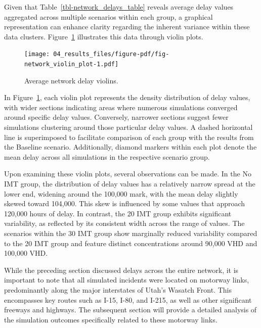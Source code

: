 \documentclass[fancy, oneside, mastersfancy, ms]{byuthesis}
\begin{document}
Given that Table~\ref{tbl-network_delays_table} reveals average delay
values aggregated across multiple scenarios within each group, a
graphical representation can enhance clarity regarding the inherent
variance within these data clusters.
Figure~\ref{fig-network_violin_plot} illustrates this data through
violin plots.

\begin{figure}

{\centering \texttt{[image: 04\_results\_files/figure-pdf/fig-network\_violin\_plot-1.pdf]}

}

\caption{\label{fig-network_violin_plot}Average network delay violins.}

\end{figure}

In Figure~\ref{fig-network_violin_plot}, each violin plot represents the
density distribution of delay values, with wider sections indicating
areas where numerous simulations converged around specific delay values.
Conversely, narrower sections suggest fewer simulations clustering
around those particular delay values. A dashed horizontal line is
superimposed to facilitate comparison of each group with the results
from the Baseline scenario. Additionally, diamond markers within each
plot denote the mean delay across all simulations in the respective
scenario group.

Upon examining these violin plots, several observations can be made. In
the No IMT group, the distribution of delay values has a relatively
narrow spread at the lower end, widening around the 100,000 mark, with
the mean delay slightly skewed toward 104,000. This skew is influenced
by some values that approach 120,000 hours of delay. In contrast, the 20
IMT group exhibits significant variability, as reflected by its
consistent width across the range of values. The scenarios within the 30
IMT group show marginally reduced variability compared to the 20 IMT
group and feature distinct concentrations around 90,000 VHD and 100,000
VHD.

While the preceding section discussed delays across the entire network,
it is important to note that all simulated incidents were located on
motorway links, predominantly along the major interstates of Utah's
Wasatch Front. This encompasses key routes such as I-15, I-80, and
I-215, as well as other significant freeways and highways. The
subsequent section will provide a detailed analysis of the simulation
outcomes specifically related to these motorway links.
\end{document}
